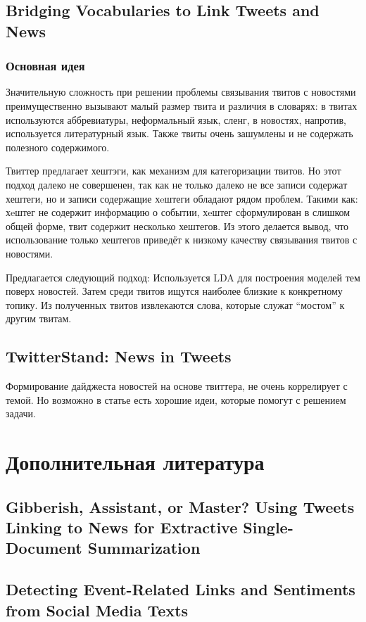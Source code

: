 \documentclass[14pt,a4paper,oneside]{extarticle}
\begin{document}
    \subsection{Bridging Vocabularies to Link Tweets and News}
        \subsubsection{Основная идея}
            Значительную сложность при решении проблемы связывания твитов с новостями преимущественно вызывают малый размер твита и различия в словарях: в твитах используются аббревиатуры, неформальный язык, сленг, в новостях, напротив, используется литературный язык. Также твиты очень зашумлены и не содержать полезного содержимого.

            Твиттер предлагает хештэги, как механизм для категоризации твитов. Но этот подход далеко не совершенен, так как не только далеко не все записи содержат хештеги, но и записи содержащие хeштеги обладают рядом проблем. Такими как: хeштег не содержит информацию о событии, хeштег сформулирован в слишком общей форме, твит содержит несколько хештегов. Из этого делается вывод, что использование только хештегов приведёт к низкому качеству связывания твитов с новостями.

            Предлагается следующий подход:
            Используется LDA для построения моделей тем поверх новостей. Затем среди твитов ищутся наиболее близкие к конкретному топику. Из полученных твитов извлекаются слова, которые служат ``мостом'' к другим твитам.
    \subsection{TwitterStand: News in Tweets}
        Формирование дайджеста новостей на основе твиттера, не очень коррелирует с темой. Но возможно в статье есть хорошие идеи, которые помогут с решением задачи.


\section{Дополнительная литература}
    \subsection{Gibberish, Assistant, or Master? Using Tweets Linking to News for Extractive Single-Document Summarization}
    \subsection{Detecting Event-Related Links and Sentiments from Social Media Texts}
\end{document}
